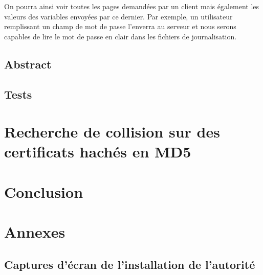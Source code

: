\documentclass[a4paper,11pt,french]{report}
\begin{document}
On pourra ainsi voir toutes les pages demandées par un client mais également les valeurs des variables envoyées par ce dernier. Par exemple, un utilisateur remplissant un champ de mot de passe l'enverra au serveur et nous serons capables de lire le mot de passe en clair dans les fichiers de journalisation.
\section{Abstract}


\section{Tests}

\chapter{Recherche de collision sur des certificats hachés en MD5}

\chapter{Conclusion}


\chapter{Annexes}

\section{Captures d'écran de l'installation de l'autorité}
\end{document}
